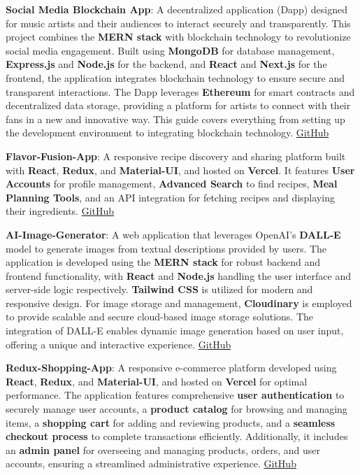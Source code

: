 \documentclass[letterpaper,11pt]{article}
\newcommand{\resumeItem}[2]{
  \item\small{
    \textbf{#1}{: #2 \vspace{-2pt}}
  }
}
\newcommand{\resumeSubItem}[2]{\resumeItem{#1}{#2}\vspace{-4pt}}
\begin{document}
    \resumeSubItem{Social Media Blockchain App}
      {A decentralized application (Dapp) designed for music artists and their audiences to interact securely and transparently. This project combines the \textbf{MERN stack} with blockchain technology to revolutionize social media engagement. Built using \textbf{MongoDB} for database management, \textbf{Express.js} and \textbf{Node.js} for the backend, and \textbf{React} and \textbf{Next.js} for the frontend, the application integrates blockchain technology to ensure secure and transparent interactions. The Dapp leverages \textbf{Ethereum} for smart contracts and decentralized data storage, providing a platform for artists to connect with their fans in a new and innovative way. This guide covers everything from setting up the development environment to integrating blockchain technology. \href{https://github.com/spriyanshucoder/Blockchain-Music-Social-Media-Dapp}{GitHub}}

  \resumeSubItem{Flavor-Fusion-App}
{A responsive recipe discovery and sharing platform built with \textbf{React}, \textbf{Redux}, and \textbf{Material-UI}, and hosted on \textbf{Vercel}. It features \textbf{User Accounts} for profile management, \textbf{Advanced Search} to find recipes, \textbf{Meal Planning Tools}, and an API integration for fetching recipes and displaying their ingredients. \href{https://github.com/spriyanshucoder/FlavorFusion-App}{GitHub}}

    \resumeSubItem{AI-Image-Generator}
      {A web application that leverages OpenAI's \textbf{DALL-E} model to generate images from textual descriptions provided by users. The application is developed using the \textbf{MERN stack} for robust backend and frontend functionality, with \textbf{React} and \textbf{Node.js} handling the user interface and server-side logic respectively. \textbf{Tailwind CSS} is utilized for modern and responsive design. For image storage and management, \textbf{Cloudinary} is employed to provide scalable and secure cloud-based image storage solutions. The integration of DALL-E enables dynamic image generation based on user input, offering a unique and interactive experience. \href{https://github.com/spriyanshucoder/AI-IMAGE-GENERATOR}{GitHub}}

    \resumeSubItem{Redux-Shopping-App}
      {A responsive e-commerce platform developed using \textbf{React}, \textbf{Redux}, and \textbf{Material-UI}, and hosted on \textbf{Vercel} for optimal performance. The application features comprehensive \textbf{user authentication} to securely manage user accounts, a \textbf{product catalog} for browsing and managing items, a \textbf{shopping cart} for adding and reviewing products, and a \textbf{seamless checkout process} to complete transactions efficiently. Additionally, it includes an \textbf{admin panel} for overseeing and managing products, orders, and user accounts, ensuring a streamlined administrative experience. \href{https://github.com/spriyanshucoder/Redux-Shopping-App}{GitHub}}
\end{document}
